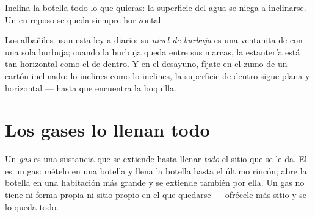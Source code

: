 \begin{omfigure}

{\small Inclina la botella todo lo que quieras: la superficie del agua
se niega a inclinarse. Un  en reposo se queda siempre
horizontal.}
\end{omfigure}

\begin{example}\label{ex:g3:solids-liquids-gases:level}
Los albañiles usan esta ley a diario: su \emph{nivel de burbuja} es
una ventanita de  con una sola burbuja; cuando la burbuja
queda entre sus marcas, la estantería está tan horizontal como el
 de dentro. Y en el desayuno, fíjate en el zumo de un cartón
inclinado: lo inclines como lo inclines, la superficie de dentro sigue
plana y horizontal --- hasta que encuentra la boquilla.
\end{example}

\section{Los gases lo llenan todo}

\begin{definition}[Gas]\label{def:g3:solids-liquids-gases:gas}
Un \emph{gas} es una sustancia que se extiende hasta llenar
\emph{todo} el sitio que se le da. El  es un gas: mételo en una
botella y llena la botella hasta el último rincón; abre la botella en
una habitación más grande y se extiende también por ella. Un gas no
tiene ni forma propia ni sitio propio en el que quedarse --- ofrécele
más sitio y se lo queda todo.
\end{definition}


